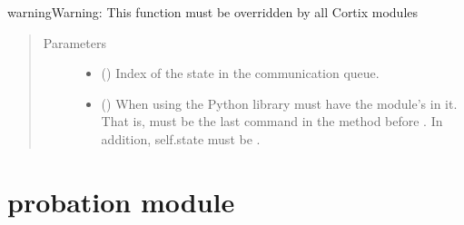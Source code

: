 \documentclass[letterpaper,10pt,openany,oneside,english]{sphinxmanual}
\begin{document}
\begin{fulllineitems}
\begin{fulllineitems}
\begin{sphinxadmonition}{warning}{Warning:}
This function must be overridden by all Cortix modules
\end{sphinxadmonition}
\begin{quote}\begin{description}
\item[{Parameters}] \leavevmode\begin{itemize}
\item {} 
\sphinxstyleliteralstrong{\sphinxupquote{{[}}}\sphinxstyleliteralstrong{\sphinxupquote{{]}}} () \textendash{} Index of the state in the communication queue.

\item {} 
\sphinxstyleliteralstrong{\sphinxupquote{{[}}}\sphinxstyleliteralstrong{\sphinxupquote{{]}}} () \textendash{} When using the Python  library  must have
the module’s  in it. That is,
 must be the last command in the
method before . In addition, self.state must be .

\end{itemize}

\end{description}\end{quote}

\end{fulllineitems}


\end{fulllineitems}



\section{probation module}
\label{\detokenize{examples_rst/probation:module-probation}}\label{\detokenize{examples_rst/probation:probation-module}}\label{\detokenize{examples_rst/probation::doc}}
\end{document}
